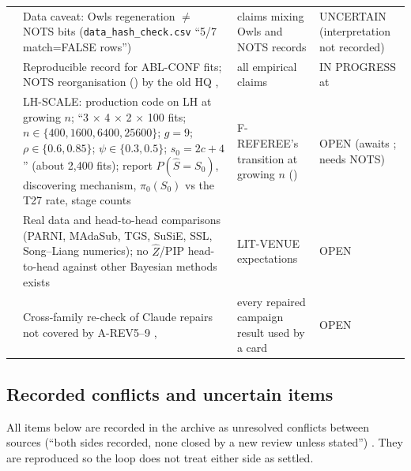 {\begin{xltabular}{\textwidth}{@{}>{\raggedright\arraybackslash}p{1.2cm}>{\raggedright\arraybackslash}X >{\raggedright\arraybackslash}p{3.6cm}>{\raggedright\arraybackslash}p{2.2cm}@{}}
 & Data caveat: Owls regeneration $\neq$ NOTS bits (\texttt{data\_hash\_check.csv} ``5/7 match=FALSE rows'')  & claims mixing Owls and NOTS records & UNCERTAIN (interpretation not recorded) \\
 & Reproducible record for ABL-CONF fits; NOTS reorganisation () by the old HQ ,  & all empirical claims & IN PROGRESS at  \\
 & LH-SCALE: production code on LH at growing $n$; ``3 × 4 × 2 × 100 fits; $n\in\{400,1600,6400,25600\}$; $g=9$; $\rho\in\{0.6,0.85\}$; $\psi\in\{0.3,0.5\}$; $s_0=2c+4$'' (about 2,400 fits); report $P(\hat S=S_0)$, discovering mechanism, $\pi_0(S_0)$ vs the T27 rate, stage counts  & F-REFEREE's transition at growing $n$ () & OPEN (awaits ; needs NOTS) \\
 & Real data and head-to-head comparisons (PARNI, MAdaSub, TGS, SuSiE, SSL, Song--Liang numerics); no $\hat Z$/PIP head-to-head against other Bayesian methods exists  & LIT-VENUE expectations & OPEN \\
 & Cross-family re-check of Claude repairs not covered by A-REV5--9 ,  & every repaired campaign result used by a card & OPEN \\
\bottomrule
\end{xltabular}
}

\subsection{Recorded conflicts and uncertain items}\label{sec:open:uncertain}

All items below are recorded in the archive as unresolved conflicts between sources (``both sides recorded, none closed by a new review unless stated'') . They are reproduced so the loop does not treat either side as settled.

